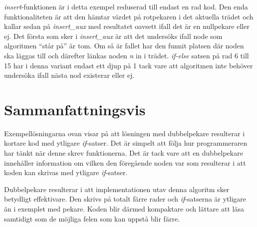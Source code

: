 \documentclass[a4paper]{article}
\begin{document}
			\emph{insert}-funktionen är i detta exempel reduserad till endast en rad kod. Den enda funktionaliteten är att den hämtar värdet på rotpekaren i det aktuella trädet och kallar sedan på \emph{insert\_aux} med resultatet oavsett ifall det är en nullpekare eller ej. Det första som sker i \emph{insert\_aux} är att det undersöks ifall node som algoritmen ``står på'' är tom. Om så är fallet har den funnit platsen där noden ska läggas till och därefter länkas noden \emph{n} in i trädet. \emph{if-else} satsen på rad 6 till 15 har i denna variant endast ett djup på 1 tack vare att algoritmen inte behöver undersöka ifall nästa nod existerar eller ej.

			\pagebreak

	\section*{Sammanfattningsvis} %

		Exempellösningarna ovan visar på att lösningen med dubbelpekare resulterar i kortare kod med ytligare \emph{if}-satser. Det är simpelt att följa hur programmeraren har tänkt när denne skrev funktionerna. Det är tack vare att en dubbelpekare innehåller information om vilken den föregående noden var som resulterar i att koden kan skrivas med ytligare \emph{if}-satser.

		Dubbelpekare resulterar i att implementationen utav denna algoritm sker betydligt effektivare. Den skrivs på totalt färre rader och \emph{if}-satserna är ytligare än i exemplet med pekare. Koden blir därmed kompaktare och lättare att läsa samtidigt som de möjliga felen som kan uppstå blir färre.
\end{document}
